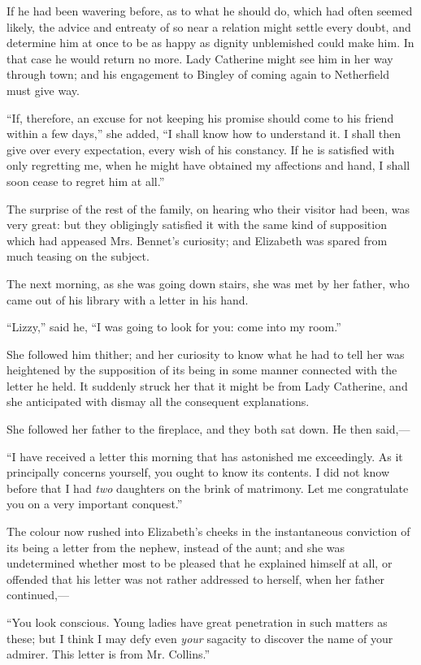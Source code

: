 \documentclass[12pt]{book}
\begin{document}
If he had been wavering before, as to what he should do, which had often seemed likely, the advice and entreaty of so near a relation might settle every doubt, and determine him at once to be as happy as dignity unblemished could make him. In that case he would return no more. Lady Catherine might see him in her way through town; and his engagement to Bingley of coming again to Netherfield must give way.

``If, therefore, an excuse for not keeping his promise should come to his friend within a few days,'' she added, ``I shall know how to understand it. I shall then give over every expectation, every wish of his constancy. If he is satisfied with only regretting me, when he might have obtained my affections and hand, I shall soon cease to regret him at all.''

The surprise of the rest of the family, on hearing who their visitor had been, was very great: but they obligingly satisfied it with the same kind of supposition which had appeased Mrs. Bennet's curiosity; and Elizabeth was spared from much teasing on the subject.

The next morning, as she was going down stairs, she was met by her father, who came out of his library with a letter in his hand.

``Lizzy,'' said he, ``I was going to look for you: come into my room.''

She followed him thither; and her curiosity to know what he had to tell her was heightened by the supposition of its being in some manner connected with the letter he held. It suddenly struck her that it might be from Lady Catherine, and she anticipated with dismay all the consequent explanations.

She followed her father to the fireplace, and they both sat down. He then said,---

``I have received a letter this morning that has astonished me exceedingly. As it principally concerns yourself, you ought to know its contents. I did not know before that I had \textit{two} daughters on the brink of matrimony. Let me congratulate you on a very important conquest.''

The colour now rushed into Elizabeth's cheeks in the instantaneous conviction of its being a letter from the nephew, instead of the aunt; and she was undetermined whether most to be pleased that he explained himself at all, or offended that his letter was not rather addressed to herself, when her father continued,---

``You look conscious. Young ladies have great penetration in such matters as these; but I think I may defy even \textit{your} sagacity to discover the name of your admirer. This letter is from Mr. Collins.''
\end{document}
